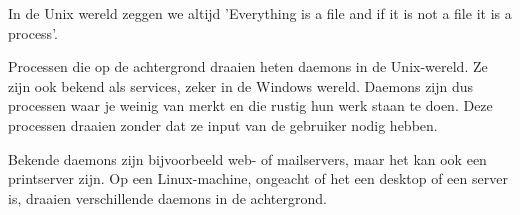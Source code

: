 In de Unix wereld zeggen we altijd 'Everything is a file and if it is not a file it is a process'.

Processen die op de achtergrond draaien heten daemons in de Unix-wereld. Ze zijn ook bekend als services, zeker in de Windows wereld. Daemons zijn dus processen waar je weinig van merkt en die rustig hun werk staan te doen. Deze processen draaien zonder dat ze input van de gebruiker nodig hebben.

Bekende daemons zijn bijvoorbeeld web- of mailservers, maar het kan ook een printserver zijn. Op een Linux-machine, ongeacht of het een desktop of een server is, draaien verschillende daemons in de achtergrond.

